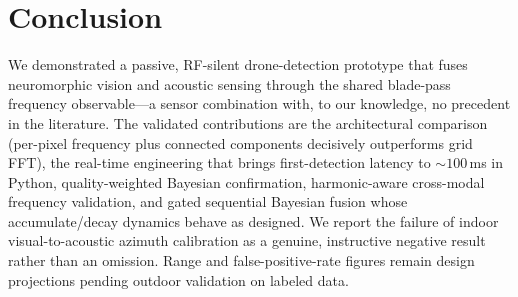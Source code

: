\documentclass[conference]{IEEEtran}
\begin{document}
\section{Conclusion}
We demonstrated a passive, RF-silent drone-detection prototype that fuses
neuromorphic vision and acoustic sensing through the shared blade-pass
frequency observable---a sensor combination with, to our knowledge, no
precedent in the literature. The validated contributions are the
architectural comparison (per-pixel frequency plus connected components
decisively outperforms grid FFT), the real-time engineering that brings
first-detection latency to ${\sim}100$\,ms in Python, quality-weighted
Bayesian confirmation, harmonic-aware cross-modal frequency validation,
and gated sequential Bayesian fusion whose accumulate/decay dynamics
behave as designed. We report the failure of indoor visual-to-acoustic
azimuth calibration as a genuine, instructive negative result rather
than an omission. Range and false-positive-rate figures remain design
projections pending outdoor validation on labeled data.
\end{document}
